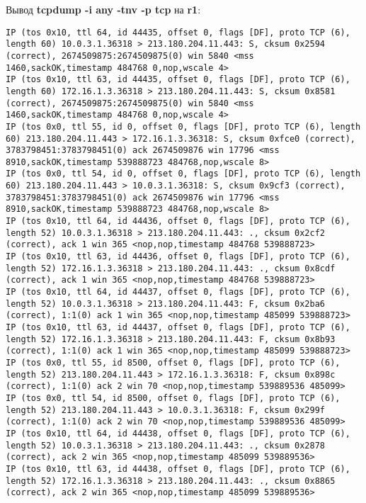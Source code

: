 \documentclass[a4paper,12pt]{article}
\begin{document}
Вывод \textbf{tcpdump -i any -tnv -p tcp} на \textbf{r1}:
\begin{Verbatim}
IP (tos 0x10, ttl 64, id 44435, offset 0, flags [DF], proto TCP (6), length 60) 10.0.3.1.36318 > 213.180.204.11.443: S, cksum 0x2594 (correct), 2674509875:2674509875(0) win 5840 <mss 1460,sackOK,timestamp 484768 0,nop,wscale 4>
IP (tos 0x10, ttl 63, id 44435, offset 0, flags [DF], proto TCP (6), length 60) 172.16.1.3.36318 > 213.180.204.11.443: S, cksum 0x8581 (correct), 2674509875:2674509875(0) win 5840 <mss 1460,sackOK,timestamp 484768 0,nop,wscale 4>
IP (tos 0x0, ttl 55, id 0, offset 0, flags [DF], proto TCP (6), length 60) 213.180.204.11.443 > 172.16.1.3.36318: S, cksum 0xfce0 (correct), 3783798451:3783798451(0) ack 2674509876 win 17796 <mss 8910,sackOK,timestamp 539888723 484768,nop,wscale 8>
IP (tos 0x0, ttl 54, id 0, offset 0, flags [DF], proto TCP (6), length 60) 213.180.204.11.443 > 10.0.3.1.36318: S, cksum 0x9cf3 (correct), 3783798451:3783798451(0) ack 2674509876 win 17796 <mss 8910,sackOK,timestamp 539888723 484768,nop,wscale 8>
IP (tos 0x10, ttl 64, id 44436, offset 0, flags [DF], proto TCP (6), length 52) 10.0.3.1.36318 > 213.180.204.11.443: ., cksum 0x2cf2 (correct), ack 1 win 365 <nop,nop,timestamp 484768 539888723>
IP (tos 0x10, ttl 63, id 44436, offset 0, flags [DF], proto TCP (6), length 52) 172.16.1.3.36318 > 213.180.204.11.443: ., cksum 0x8cdf (correct), ack 1 win 365 <nop,nop,timestamp 484768 539888723>
IP (tos 0x10, ttl 64, id 44437, offset 0, flags [DF], proto TCP (6), length 52) 10.0.3.1.36318 > 213.180.204.11.443: F, cksum 0x2ba6 (correct), 1:1(0) ack 1 win 365 <nop,nop,timestamp 485099 539888723>
IP (tos 0x10, ttl 63, id 44437, offset 0, flags [DF], proto TCP (6), length 52) 172.16.1.3.36318 > 213.180.204.11.443: F, cksum 0x8b93 (correct), 1:1(0) ack 1 win 365 <nop,nop,timestamp 485099 539888723>
IP (tos 0x0, ttl 55, id 8500, offset 0, flags [DF], proto TCP (6), length 52) 213.180.204.11.443 > 172.16.1.3.36318: F, cksum 0x898c (correct), 1:1(0) ack 2 win 70 <nop,nop,timestamp 539889536 485099>
IP (tos 0x0, ttl 54, id 8500, offset 0, flags [DF], proto TCP (6), length 52) 213.180.204.11.443 > 10.0.3.1.36318: F, cksum 0x299f (correct), 1:1(0) ack 2 win 70 <nop,nop,timestamp 539889536 485099>
IP (tos 0x10, ttl 64, id 44438, offset 0, flags [DF], proto TCP (6), length 52) 10.0.3.1.36318 > 213.180.204.11.443: ., cksum 0x2878 (correct), ack 2 win 365 <nop,nop,timestamp 485099 539889536>
IP (tos 0x10, ttl 63, id 44438, offset 0, flags [DF], proto TCP (6), length 52) 172.16.1.3.36318 > 213.180.204.11.443: ., cksum 0x8865 (correct), ack 2 win 365 <nop,nop,timestamp 485099 539889536>
\end{Verbatim}
\end{document}
